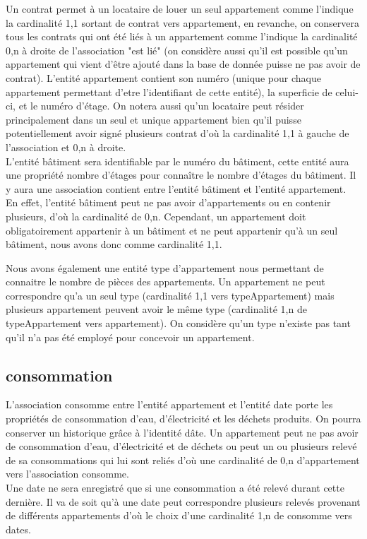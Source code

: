 Un contrat permet à un locataire de louer un seul appartement comme l'indique la cardinalité 1,1 sortant de contrat vers appartement, en revanche, on conservera tous les contrats qui ont été liés à un appartement comme l'indique la cardinalité 0,n à droite de l'association "est lié" (on considère aussi qu’il est possible qu’un appartement qui vient d’être ajouté dans la base de donnée puisse ne pas avoir de contrat). L’entité appartement contient son numéro (unique pour chaque appartement permettant d'etre l'identifiant de cette entité), la superficie de celui-ci, et le numéro d’étage. On notera aussi qu'un locataire peut résider principalement dans un seul et unique appartement bien qu'il puisse potentiellement avoir signé plusieurs contrat d'où la cardinalité 1,1 à gauche de l'association et 0,n à droite.\\

L’entité bâtiment sera identifiable par le numéro du bâtiment, cette entité aura une propriété nombre d’étages pour connaître le nombre d’étages du bâtiment. Il y aura une association contient entre l’entité bâtiment et l’entité appartement. En effet, l’entité bâtiment peut ne pas avoir d’appartements ou en contenir plusieurs, d’où la cardinalité de 0,n. Cependant, un appartement doit obligatoirement appartenir à un bâtiment et ne peut appartenir qu’à un seul bâtiment, nous avons donc comme cardinalité 1,1.
	 
Nous avons également une entité type d’appartement nous permettant de connaitre le nombre de pièces des appartements. Un appartement ne peut correspondre qu'a un seul type (cardinalité 1,1 vers typeAppartement) mais plusieurs appartement peuvent avoir le même type (cardinalité 1,n de typeAppartement vers appartement). On considère qu'un type n'existe pas tant qu'il n'a pas été employé pour concevoir un appartement.

\subsection{consommation}

L'association consomme entre l’entité appartement et l’entité date porte les propriétés de consommation d'eau, d'électricité et les déchets produits. On pourra conserver un historique grâce à l'identité dâte. Un appartement peut ne pas avoir de consommation d’eau, d’électricité et de déchets ou peut un ou plusieurs relevé de sa consommations qui lui sont reliés d'où une cardinalité de 0,n d'appartement vers l'association consomme.\\

Une date ne sera enregistré que si une consommation a été relevé durant cette dernière. Il va de soit qu'à une date peut correspondre plusieurs relevés provenant de différents appartements d'où le choix d'une cardinalité 1,n de consomme vers dates.
